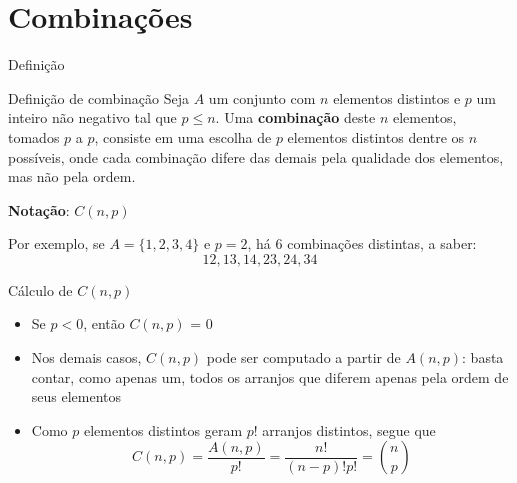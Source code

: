 \section{Combinações}

\begin{frame}[fragile]{Definição}

    \begin{block}{Definição de combinação}
        Seja $A$ um conjunto com $n$ elementos distintos e $p$ um inteiro não negativo tal que 
        $p \leq n$.  Uma \textbf{combinação} deste $n$ elementos, tomados $p$ a $p$, consiste em uma 
        escolha de $p$ elementos distintos dentre os $n$ possíveis, onde cada combinação difere das
        demais pela qualidade dos elementos, mas não pela ordem.

        \textbf{Notação}: $C(n, p)$
    \end{block}

    \vspace{0.1in}

    Por exemplo, se $A = \{1, 2, 3, 4\}$ e $p = 2$, há $6$ combinações distintas, a saber: 
    $$
        12, 13, 14, 23, 24, 34
    $$
\end{frame}

\begin{frame}[fragile]{Cálculo de $C(n, p)$}

    \begin{itemize}
        \item Se $p < 0$, então $C(n, p)$ = 0

        \item Nos demais casos, $C(n,p)$ pode ser computado a partir de $A(n,p)$: basta contar,
            como apenas um, todos os arranjos que diferem apenas pela ordem de seus elementos

        \item Como $p$ elementos distintos geram $p!$ arranjos distintos, segue que
        $$
            C(n, p) = \frac{A(n, p)}{p!} = \frac{n!}{(n - p)!p!} = \binom{n}{p}
        $$
    \end{itemize}
\end{frame}

